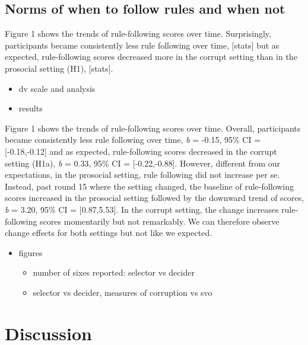 \documentclass[man]{apa6}
\providecommand{\tightlist}{%
  \setlength{\itemsep}{0pt}\setlength{\parskip}{0pt}}
\begin{document}
\hypertarget{norms-of-when-to-follow-rules-and-when-not}{%
\subsection{Norms of when to follow rules and when
not}\label{norms-of-when-to-follow-rules-and-when-not}}

Figure 1 shows the trends of rule-following scores over time.
Surprisingly, participants became consistently less rule following over
time, {[}stats{]} but as expected, rule-following scores decreased more
in the corrupt setting than in the prosocial setting (H1), {[}stats{]}.

\begin{itemize}
\tightlist
\item
  dv scale and analysis
\item
  results
\end{itemize}

Figure 1 shows the trends of rule-following scores over time. Overall,
participants became consistently less rule following over time, \emph{b}
= -0.15, 95\% CI = {[}-0.18,-0.12{]} and as expected, rule-following
scores decreased in the corrupt setting (H1a), \emph{b} = 0.33, 95\% CI
= {[}-0.22,-0.88{]}. However, different from our expectations, in the
prosocial setting, rule following did not increase per se. Instead, past
round 15 where the setting changed, the baseline of rule-following
scores increased in the prosocial setting followed by the downward trend
of scores, \emph{b} = 3.20, 95\% CI = {[}0.87,5.53{]}. In the corrupt
setting, the change increases rule-following scores momentarily but not
remarkably. We can therefore observe change effects for both settings
but not like we expected.

\begin{itemize}
\tightlist
\item
  figures

  \begin{itemize}
  \tightlist
  \item
    number of sixes reported: selector vs decider
  \item
    selector vs decider, measures of corruption vs svo
  \end{itemize}
\end{itemize}

\hypertarget{discussion}{%
\section{Discussion}\label{discussion}}
\end{document}
